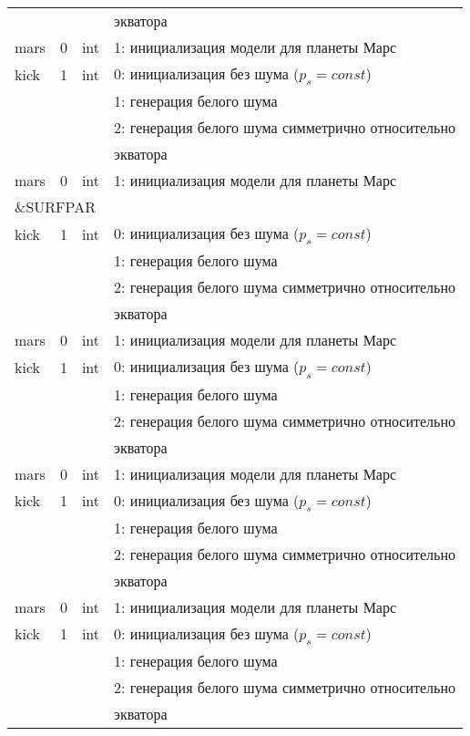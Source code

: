 \begin{longtable}[c]{|l|c|l|l|}
  & & & экватора    \\
 mars & 0 & int & 1: инициализация модели для планеты Марс     \\
kick & 1 & int & 0: инициализация без шума ($p_s = const$) \\
      &   &     & 1: генерация белого шума                  \\
      &   &     & 2: генерация белого шума симметрично относительно \\
  & & & экватора    \\
 mars & 0 & int & 1: инициализация модели для планеты Марс     \\
 \hline
 \multicolumn{4}{|l|}{\&SURFPAR}        \\ \hline
kick & 1 & int & 0: инициализация без шума ($p_s = const$) \\
      &   &     & 1: генерация белого шума                  \\
      &   &     & 2: генерация белого шума симметрично относительно \\
  & & & экватора    \\
 mars & 0 & int & 1: инициализация модели для планеты Марс     \\
kick & 1 & int & 0: инициализация без шума ($p_s = const$) \\
      &   &     & 1: генерация белого шума                  \\
      &   &     & 2: генерация белого шума симметрично относительно \\
  & & & экватора    \\
 mars & 0 & int & 1: инициализация модели для планеты Марс     \\
kick & 1 & int & 0: инициализация без шума ($p_s = const$) \\
      &   &     & 1: генерация белого шума                  \\
      &   &     & 2: генерация белого шума симметрично относительно \\
  & & & экватора    \\
 mars & 0 & int & 1: инициализация модели для планеты Марс     \\
kick & 1 & int & 0: инициализация без шума ($p_s = const$) \\
      &   &     & 1: генерация белого шума                  \\
      &   &     & 2: генерация белого шума симметрично относительно \\
  & & & экватора    \\

\end{longtable}

